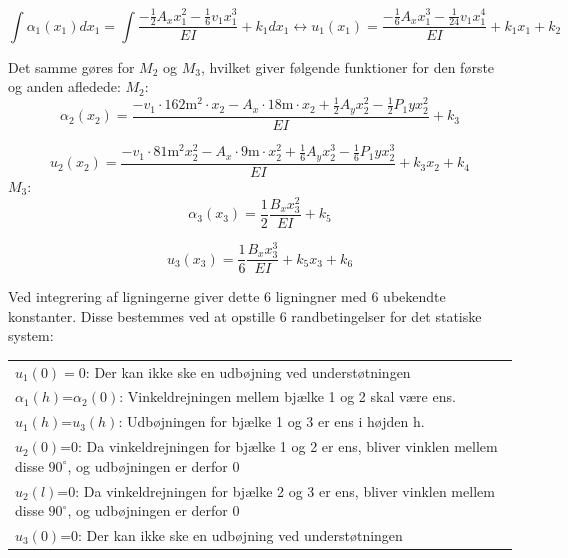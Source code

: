 \begin{equation}
	\int \alpha_1(x_1) dx_1 = \int \frac{-\frac{1}{2} A_x x_1^2 - \frac{1}{6} v_1 x_1^3}{EI} + k_1 dx_1 \leftrightarrow
	u_1(x_1) = \frac{-\frac{1}{6} A_x x_1^3 - \frac{1}{24} v_1x_1^4 }{EI} + k_1 x_1 + k_2
\end{equation}

Det samme gøres for $M_2$ og $M_3$, hvilket giver følgende funktioner for den første og anden afledede: 
\newline
\newline
$M_2$:
\begin{equation}
	\alpha_2(x_2) = \frac{-v_1 \cdot 162 \text{m}^2 \cdot x_2 - A_x \cdot 18 \text{m} \cdot x_2 + \frac{1}{2} A_y x_2^2 - \frac{1}{2}P_1y x_2^2}{EI} + k_3
\end{equation}
	
\begin{equation}
	u_2(x_2) = \frac{-v_1 \cdot 81 \text{m}^2 x_2^2 - A_x \cdot 9 \text{m} \cdot x_2^2 + \frac{1}{6} A_y x_2^3 - \frac{1}{6} P_1y x_2^3}{EI} + k_3 x_2 + k_4
\end{equation} 
\newline
\newline
$M_3$:
\begin{equation}
\alpha_3(x_3) = \frac{1}{2}\frac{B_x x_3^2}{EI} + k_5
\end{equation}

\begin{equation}
u_3(x_3) = \frac{1}{6} \frac{B_x x_3^3}{EI} + k_5 x_3 + k_6
\end{equation}

Ved integrering af ligningerne giver dette 6 ligningner med 6 ubekendte konstanter. Disse bestemmes ved at opstille 6 randbetingelser for det statiske system: 

\begin{table}[h]
	\begin{tabular}{l}
		$u_1(0)=0$: Der kan ikke ske en udbøjning ved understøtningen   \\ 
		$\alpha_1(h)$=$\alpha_2(0)$: Vinkeldrejningen mellem bjælke 1 og 2 skal være ens. \\
		$u_1(h)$=$u_3(h)$: Udbøjningen for bjælke 1 og 3 er ens i højden h. \\
		$u_2(0)$=0: Da vinkeldrejningen for bjælke 1 og 2 er ens, bliver vinklen mellem disse $90^{\circ}$, og udbøjningen er derfor 0 \\
		$u_2(l)$=0: Da vinkeldrejningen for bjælke 2 og 3 er ens, bliver vinklen mellem disse $90^{\circ}$, og udbøjningen er derfor 0 \\
		$u_3(0)$=0: Der kan ikke ske en udbøjning ved understøtningen   \\
	\end{tabular}
\end{table}

